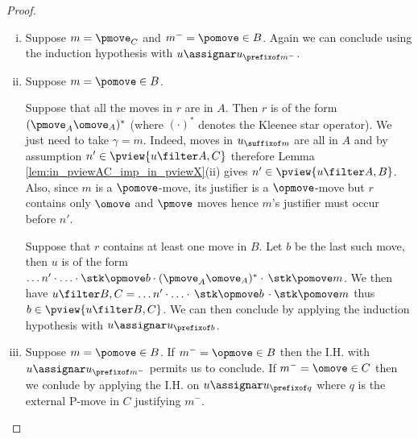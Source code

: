 \begin{proof}
\begin{enumerate}[i.]
\item Suppose $m = \pmove_C$ and $m^- = \pomove \in B$.
Again we can conclude using 
the induction hypothesis with $u \assignar u_{\prefixof m^-}$.

\item Suppose $m = \pomove \in B$.

Suppose that all the moves in $r$ are in $A$.
Then $r$ is of the form $(\pmove_A \omove_A)^*$ (where $(\cdot)^*$ denotes the Kleenee star operator). 
We just need to take $\gamma = m$. 
Indeed, moves in $u_{\suffixof m}$ are all in $A$
and by assumption $n'\in\pview{u\filter A,C}$  therefore
Lemma \ref{lem:in_pviewAC_imp_in_pviewX}(ii) gives
$n'\in\pview{u\filter A,B}$.
Also, since $m$ is a $\pomove$-move, 
its justifier is a $\opmove$-move but $r$ contains only $\omove$ and $\pmove$ moves hence $m$'s justifier must occur before $n'$.

Suppose that $r$ contains at least one move in $B$. Let $b$ be the last such move, then $u$ is of the form $\ldots n' \cdot \ldots \cdot \stk\opmove  b \cdot (\pmove_A \omove_A)^* \cdot\thinspace\stk\pomove m $. We then have
$u\filter B,C = \ldots n' \cdot \ldots \cdot 
\thinspace\stk\opmove b \thinspace\cdot \stk\pomove m $ thus $b \in \pview{u\filter B,C}$. We can then conclude by applying the induction hypothesis with $u \assignar u_{\prefixof b}$.

\item Suppose $m = \pomove \in B$.
If $m^- = \opmove \in B$ then the I.H. with $u \assignar u_{\prefixof m^-}$ permits us to conclude.
If $m^- = \omove \in C$ then we conlude by applying  the I.H. on $u \assignar u_{\prefixof q}$ where $q$ is the external P-move in $C$ justifying
$m^-$.
\end{enumerate}
\end{proof}

